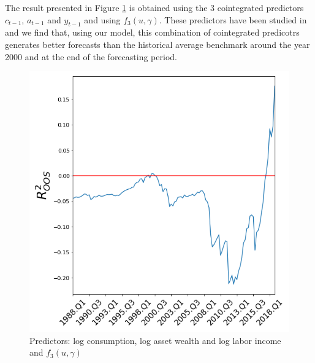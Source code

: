 \documentclass[a4paper,12pt,times,numbered,print,index]{report}
\numberwithin{equation}{section}
\begin{document}
	The result presented in Figure \ref{cwyf4} is obtained using the 3 cointegrated predictors $c_{t-1}$, $a_{t-1}$ and $y_{t-1}$ and using $f_3\left( u,\gamma\right)$. These predictors have been studied in \cite{lettau2001consumption} and we find that, using our model, this combination of cointegrated predicotrs generates better forecasts than the historical average benchmark around the year 2000 and at the end of the forecasting period. 
	
	
	\begin{figure}[H]
		\centering
		\captionsetup{justification=centering}
		\caption{Predictors: log consumption, log asset wealth and log labor income and  $f_{3}( u,\gamma)$ }
		\label{cwyf4}%
		\includegraphics[width=0.5\linewidth]{plots/cwy(f4).png}
	\end{figure}
	
	
	
\end{document}
